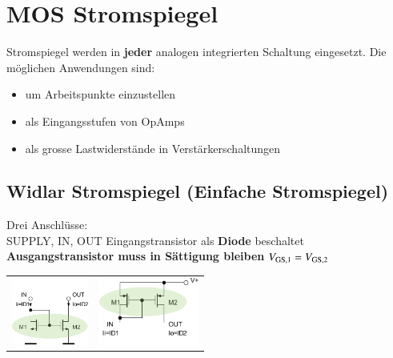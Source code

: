 \section{MOS Stromspiegel}

\begin{minipage}[t]{0.48\columnwidth}
    Stromspiegel werden in \textbf{jeder} analogen integrierten Schaltung eingesetzt.
    Die möglichen Anwendungen sind:
\end{minipage}
\hfill
\begin{minipage}[t]{0.48\columnwidth}
    \begin{itemize}
        \item um Arbeitspunkte einzustellen
        \item als Eingangsstufen von OpAmps
        \item als grosse Lastwiderstände in Verstärkerschaltungen
    \end{itemize}
\end{minipage}


\subsection{Widlar Stromspiegel (Einfache Stromspiegel)}

\begin{minipage}[c]{0.35\columnwidth}
    \raggedright
    \begin{outline}
        \1 Drei Anschlüsse: \\
            SUPPLY, IN, OUT
        \1 Eingangstransistor als \textbf{Diode} beschaltet
        \1 \textbf{Ausgangstransistor muss in Sättigung bleiben}
        \1 $V_{\rm GS,1} = V_{\rm GS,2}$
    \end{outline}
\end{minipage}
\hfill
\begin{minipage}[c]{0.64\columnwidth}

     \begin{tabular}{c c@{}}
        \includegraphics[height=2.2cm]{images/06_stormspiegel_widlar_nKanal.pdf} & 
        \includegraphics[height=2.2cm]{images/06_stormspiegel_widlar_pKanal.pdf}
    \end{tabular}
    
\end{minipage}


